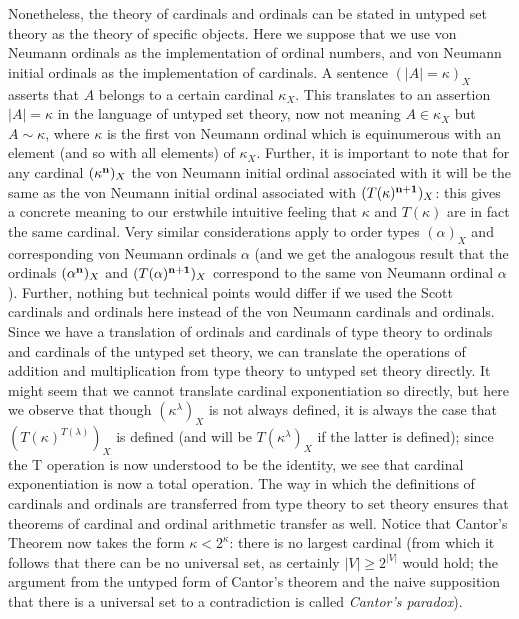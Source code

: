 \documentclass[12pt]{book}
\begin{document}
Nonetheless, the theory of cardinals and ordinals can be stated in
untyped set theory as the theory of specific objects.  Here we suppose
that we use von Neumann ordinals as the implementation of ordinal
numbers, and von Neumann initial ordinals as the implementation of
cardinals.  A sentence $(|A|=\kappa)_X$ asserts that $A$ belongs to a
certain cardinal $\kappa_X$.  This translates to an assertion $|A| =
\kappa$ in the language of untyped set theory, now not meaning $A \in
\kappa_X$ but $A \sim \kappa$, where $\kappa$ is the first von Neumann
ordinal which is equinumerous with an element (and so with all
elements) of $\kappa_X$.  Further, it is important to note that for
any cardinal $(\kappa^{\bf n})_X$ the von Neumann initial ordinal
associated with it will be the same as the von Neumann initial ordinal
associated with $(T(\kappa)^{\bf n+1})_X$: this gives a concrete
meaning to our erstwhile intuitive feeling that $\kappa$ and
$T(\kappa)$ are in fact the same cardinal.  Very similar
considerations apply to order types $(\alpha)_X$ and corresponding von
Neumann ordinals $\alpha$ (and we get the analogous result that the
ordinals $(\alpha^{\bf n})_X$ and $(T(\alpha)^{\bf n+1})_X$ correspond
to the same von Neumann ordinal $\alpha$).  Further, nothing but
technical points would differ if we used the Scott cardinals and
ordinals here instead of the von Neumann cardinals and ordinals.
Since we have a translation of ordinals and cardinals of type theory
to ordinals and cardinals of the untyped set theory, we can translate
the operations of addition and multiplication from type theory to
untyped set theory directly.  It might seem that we cannot translate
cardinal exponentiation so directly, but here we observe that though
$(\kappa^{\lambda})_X$ is not always defined, it is always the case
that $(T(\kappa)^{T(\lambda)})_X$ is defined (and will be
$T(\kappa^{\lambda})_X$ if the latter is defined); since the T
operation is now understood to be the identity, we see that cardinal
exponentiation is now a total operation.  The way in which the
definitions of cardinals and ordinals are transferred from type theory
to set theory ensures that theorems of cardinal and ordinal arithmetic
transfer as well.  Notice that Cantor's Theorem now takes the form
$\kappa < 2^{\kappa}$: there is no largest cardinal (from which it
follows that there can be no universal set, as certainly $|V| \geq
2^{|V|}$ would hold; the argument from the untyped form of Cantor's
theorem and the naive supposition that there is a universal set to a
contradiction is called {\em Cantor's paradox\/}).
\end{document}
